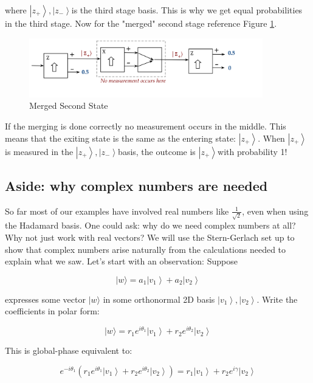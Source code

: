 \documentclass[main.tex]{subfiles}
\begin{document}
    where $\left|z_{+}\right\rangle,\left|z_{-}\right\rangle$is the third stage basis. This is why we get equal probabilities in the third stage. Now for the "merged" second stage reference Figure \ref{fig:53sg6}.
    
    \begin{figure}
        \centering
        \includegraphics[width=4in]{notes/figs/n05/53sg6.png}
        \caption{Merged Second State}
        \label{fig:53sg6}
    \end{figure}
    
    If the merging is done correctly no measurement occurs in the middle. This means that the exiting state is the same as the entering state: $\left|z_{+}\right\rangle$. When $\left|z_{+}\right\rangle$is measured in the $\left|z_{+}\right\rangle,\left|z_{-}\right\rangle$basis, the outcome is $\left|z_{+}\right\rangle$with probability 1!

\subsection{Aside: why complex numbers are needed}

    So far most of our examples have involved real numbers like $\frac{1}{\sqrt{2}}$, even when using the Hadamard basis. One could ask: why do we need complex numbers at all? Why not just work with real vectors? We will use the Stern-Gerlach set up to show that complex numbers arise naturally from the calculations needed to explain what we saw. Let's start with an observation: Suppose
    
    $$
    |w\rangle=a_{1}\left|v_{1}\right\rangle+a_{2}\left|v_{2}\right\rangle
    $$
    
    expresses some vector $|w\rangle$ in some orthonormal 2D basis $\left|v_{1}\right\rangle,\left|v_{2}\right\rangle$. Write the coefficients in polar form:
    
    $$
    |w\rangle=r_{1} e^{i \theta_{1}}\left|v_{1}\right\rangle+r_{2} e^{i \theta_{2}}\left|v_{2}\right\rangle
    $$
    
    This is global-phase equivalent to:
    
    $$
    e^{-i \theta_{1}}\left(r_{1} e^{i \theta_{1}}\left|v_{1}\right\rangle+r_{2} e^{i \theta_{2}}\left|v_{2}\right\rangle\right)=r_{1}\left|v_{1}\right\rangle+r_{2} e^{i \gamma}\left|v_{2}\right\rangle
    $$
    
\end{document}
